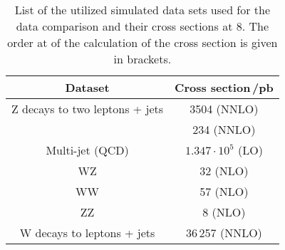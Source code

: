
\begin{table}[h]
    \begin{center}
        \caption[List  of all data samples used for the data simulation comparison]{List of the utilized simulated data sets used for the data comparison and their cross sections at 8\TeV{}. The order at of the calculation of the cross section is given in brackets.}
        \label{tab:DCDS}
        \begin{tabular}{c c}
            Dataset & Cross section\,/\unit{pb} \\
            \midrule[2pt]
            Z decays to two leptons + jets & 3504 (NNLO)  \\
            \ttbar{} & 234 (NNLO) \\
            Multi-jet (QCD) & $1.347\cdot10^{5}$ (LO) \\
            WZ & 32 (NLO) \\
            WW & 57 (NLO) \\
            ZZ & 8 (NLO) \\
            W decays to leptons + jets & 36\,257 (NNLO) \\
        \end{tabular}
    \end{center}
\end{table}